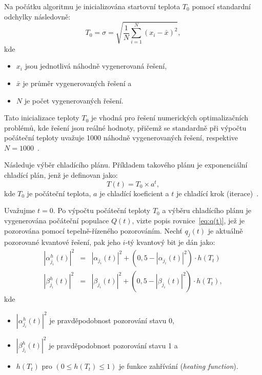 Na počátku algoritmu je inicializována startovní teplota $T_0$ pomocí standardní odchylky následovně:
\begin{equation}\label{eq:qisa-T0}
    T_0 = \sigma = \sqrt{\frac{1}{N}\sum_{i=1}^{N}\left(x_i - \bar{x}\right)^2},
\end{equation}
kde
\begin{itemize}
    \item $x_i$ jsou jednotlivá náhodně vygenerovaná řešení,
    \item $\bar{x}$ je průměr vygenerovaných řešení a
    \item $N$ je počet vygenerovaných řešení.
\end{itemize}
Tato inicializace teploty $T_0$ je vhodná pro řešení numerických optimalizačních problémů, kde řešení jsou reálné hodnoty, přičemž se standardně při výpočtu počáteční teploty uvažuje 1000 náhodně vygenerovaných řešení, respektive $N=1000$~\cite{qisa,FundamentalsOfProbability}.

Následuje výběr chladícího plánu. Příkladem takového plánu je exponenciální chladící plán, jenž je definovan jako:
\begin{equation*}
    T\left(t\right) = T_0 \times a^t,
\end{equation*}
kde $T_0$ je počáteční teplota, $a$ je chladící koeficient a $t$ je chladící krok (iterace)~\cite{qisa}. 

Uvažujme $t= 0$. Po výpočtu počáteční teploty $T_0$ a výběru chladícího plánu je vygenerována počáteční populace $Q\left(t\right)$, vizte popis rovnice~\ref{eq:q(t)}, jež je pozorována pomocí tepelně-řízeného pozorováním. 
Nechť $q_j\left(t\right)$ je aktuálně pozorované kvantové řešení, pak jeho $i$-tý kvantový bit je dán jako:
\begin{eqnarray*}
    \left|\alpha_{j_i}^h\left(t\right)\right|^2 &=& \left|\alpha_{j_i}\left(t\right)\right|^2 + \left(0,5 - \left|\alpha_{j_i}\left(t\right)\right|^2\right) \cdot h\left(T_t\right) \\
    \left|\beta_{j_i}^h\left(t\right) \right|^2 &=& \left|\beta_{j_i}\left(t\right) \right|^2 + \left(0,5 - \left|\beta_{j_i}\left(t\right) \right|^2\right) \cdot h\left(T_t\right),
\end{eqnarray*}
kde 
\begin{itemize}
    \item $\left|\alpha_{j_i}^h\left(t\right)\right|^2$ je pravděpodobnost pozorování stavu 0,
    \item $\left|\beta_{j_i}^h\left(t\right)\right|^2$ je pravděpodobnost pozorování stavu 1 a
    \item $h(T_t)$ pro $\left(0 \leq h(T_t) \leq 1 \right)$ je funkce zahřívání (\emph{heating function}). 
\end{itemize}

